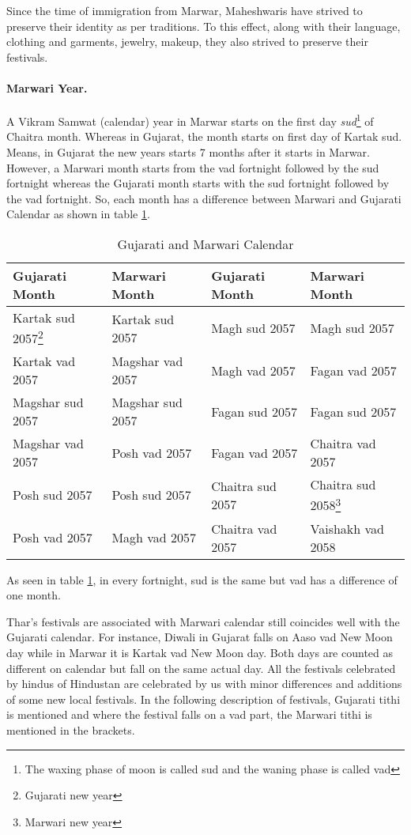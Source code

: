Since the time of immigration from Marwar, Maheshwaris have strived to preserve
their identity as per traditions. To this effect, along with their language,
clothing and garments, jewelry, makeup, they also strived to preserve their
festivals.
\paragraph{Marwari Year.} A Vikram Samwat (calendar) year in Marwar starts on
the first day \textit{sud}\footnote{The waxing phase of moon is called sud and
the waning phase is called vad} of Chaitra month. Whereas in Gujarat, the month
starts on first day of Kartak sud. Means, in Gujarat the new years starts 7
months after it starts in Marwar. However, a Marwari month starts from the vad
fortnight followed by the sud fortnight whereas the Gujarati month starts with
the sud fortnight followed by the vad fortnight.
So, each month has a difference between Marwari and Gujarati Calendar as shown
in table \ref{tbl:cal}.

\begin{table}
\begin{center}
\begin{tabular}{l|l|l|l}
\hline
\textbf{Gujarati Month} & \textbf{Marwari Month} & \textbf{Gujarati Month} &
\textbf{Marwari Month}\\ 
\hline
Kartak sud 2057\footnote{Gujarati new year} & Kartak sud 2057 & Magh sud 2057 & Magh sud 2057 \\
Kartak vad 2057 & Magshar vad 2057 & Magh vad 2057 & Fagan vad 2057 \\
Magshar sud 2057 & Magshar sud 2057 & Fagan sud 2057 & Fagan sud 2057 \\
Magshar vad 2057 & Posh vad 2057 & Fagan vad 2057 & Chaitra vad 2057 \\
Posh sud 2057 & Posh sud 2057 &Chaitra sud 2057 &Chaitra sud
2058\footnote{Marwari new year} \\
Posh vad 2057 & Magh vad 2057 & Chaitra vad 2057 & Vaishakh vad 2058 \\
\hline
\end{tabular}
\end{center}
\label{tbl:cal}
\caption{Gujarati and Marwari Calendar}
\end{table}
As seen in table \ref{tbl:cal}, in every fortnight, sud is the same but vad has
a difference of one month.

Thar's festivals are associated with Marwari calendar still coincides well with
the Gujarati calendar. For instance, Diwali in Gujarat falls on Aaso vad New
Moon day while in Marwar it is Kartak vad New Moon day. Both days are counted as
different on calendar but fall on the same actual day. All the festivals
celebrated by hindus of Hindustan are celebrated by us with minor differences
and additions of some new local festivals.
In the following description of festivals, Gujarati tithi is mentioned and where
the festival falls on a vad part, the Marwari tithi is mentioned in the
brackets.

